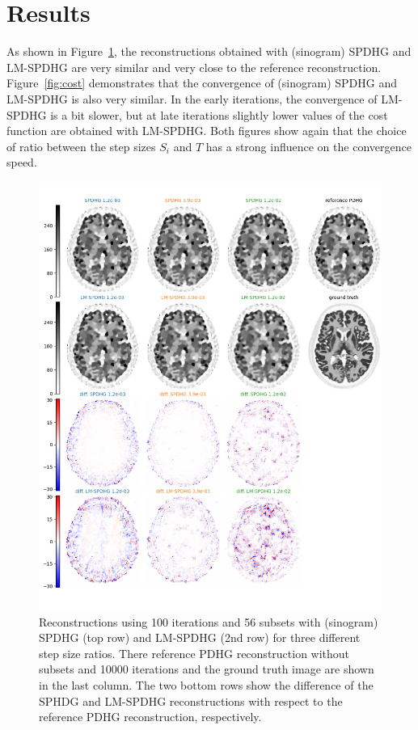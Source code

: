\documentclass{IEEEtran}
\begin{document}

\section{Results}

As shown in Figure~\ref{fig:recons}, the reconstructions obtained with (sinogram) SPDHG and LM-SPDHG
are very similar and very close to the reference reconstruction.
Figure~\ref{fig:cost} demonstrates that the convergence of (sinogram) SPDHG and
LM-SPDHG is also very similar. In the early iterations, the convergence of LM-SPDHG is a bit slower, but
at late iterations slightly lower values of the cost function are obtained with LM-SPDHG.
Both figures show again that the choice of ratio between the step sizes $S_i$ and $T$ has
a strong influence on the convergence speed.

\begin{figure}[t]
\centerline{\includegraphics[width=1.0\columnwidth]{./figs/brain2d_counts_1.0E+06_beta_2.0E-03_niter_10000_100_nsub_56_precond_False.png}}
\caption{Reconstructions using 100 iterations and 56 subsets with (sinogram) SPDHG (top row) and 
LM-SPDHG (2nd row) for three different step size ratios. 
There reference PDHG reconstruction without subsets and 10000 iterations and
the ground truth image are shown in the last column. 
The two bottom rows show the difference of the SPHDG and LM-SPDHG reconstructions with respect
to the reference PDHG reconstruction, respectively.}
\label{fig:recons}
\end{figure}
\end{document}
